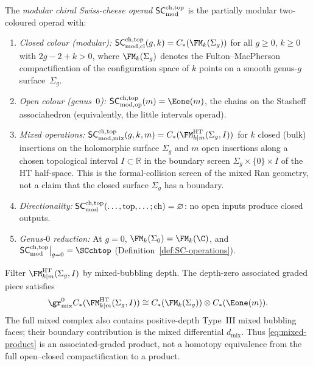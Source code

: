 \begin{definition}
\label{def:SC-mod}
The \emph{modular chiral Swiss-cheese operad} $\mathsf{SC}^{\mathrm{ch,top}}_{\mathrm{mod}}$ is the
partially modular two-coloured operad with:
\begin{enumerate}[label=\textup{(\roman*)}]
\item \emph{Closed colour (modular):}
 $\SCmodcl(g,k) = C_\ast(\FM_k(\Sigma_g))$ for all
 $g \ge 0$, $k \ge 0$ with $2g - 2 + k > 0$, where $\FM_k(\Sigma_g)$
 denotes the Fulton--MacPherson compactification of the configuration
 space of $k$ points on a smooth genus-$g$ surface~$\Sigma_g$.

\item \emph{Open colour (genus~$0$):}
 $\SCmodop(m) = \Eone(m)$, the chains on the
 Stasheff associahedron (equivalently, the little intervals
 operad).

\item \emph{Mixed operations:}
 $\SCmodmix(g, k, m)
 = C_\ast(\FM^{\mathrm{HT}}_{k|m}(\Sigma_g, I))$
 for $k$ closed (bulk) insertions on the holomorphic surface
 $\Sigma_g$ and $m$ open insertions along a chosen topological
 interval $I\subset \mathbb R$ in the boundary screen
 $\Sigma_g\times\{0\}\times I$ of the HT half-space. This is the
 formal-collision screen of the mixed Ran geometry, not a claim that
 the closed surface $\Sigma_g$ has a boundary.

\item \emph{Directionality:}
 $\mathsf{SC}^{\mathrm{ch,top}}_{\mathrm{mod}}(\ldots, \mathrm{top}, \ldots; \mathrm{ch})
 = \varnothing$: no open inputs produce closed outputs.

\item \emph{Genus-$0$ reduction:}
 At $g = 0$, $\FM_k(\Sigma_0) = \FM_k(\C)$, and
 $\SCmod\big|_{g=0} = \SCchtop$
 (Definition~\ref{def:SC-operations}).
\end{enumerate}
\end{definition}

\begin{proposition}
\label{prop:mixed-product-decomposition}
Filter $\FM^{\mathrm{HT}}_{k|m}(\Sigma_g,I)$ by mixed-bubbling
depth. The depth-zero associated graded piece satisfies
\begin{equation}\label{eq:mixed-product}
 \gr^0_{\mathrm{mix}} C_\ast(\FM^{\mathrm{HT}}_{k|m}(\Sigma_g,I))
 \cong
 C_\ast(\FM_k(\Sigma_g)) \otimes C_\ast(\Eone(m)).
\end{equation}
The full mixed complex also contains positive-depth Type~III
mixed bubbling faces; their boundary contribution is the mixed
differential $d_{\mathrm{mix}}$. Thus
\eqref{eq:mixed-product} is an associated-graded product, not a
homotopy equivalence from the full open--closed compactification
to a product.
\end{proposition}

